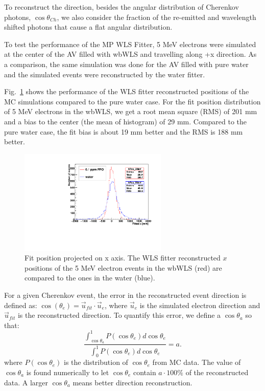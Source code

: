 To reconstruct the direction, besides the angular distribution of Cherenkov photons, $\cos\theta_{Ch}$, we also consider the fraction of the re-emitted and wavelength shifted photons that cause a flat angular distribution.

To test the performance of the MP WLS Fitter, 5 MeV electrons were simulated at the center of the AV filled with wbWLS and travelling along +x direction. As a comparison, the same simulation was done for the AV filled with pure water and the simulated events were reconstructed by the water fitter.

Fig.~\ref{WLSFitPos} shows the performance of the WLS fitter reconstructed positions of the MC simulations compared to the pure water case. For the fit position distribution of 5 MeV electrons in the wbWLS, we get a root mean square (RMS) of 201 mm and a bias to the center (the mean of histogram) of 29 mm. Compared to the pure water case, the fit bias is about 19 mm better and the RMS is 188 mm better.

\begin{figure}[htbp]	
	\centering			
	\includegraphics[height=5cm]{WLS_FittedPos.pdf}		
	\caption{\label{WLSFitPos} Fit position projected on x axis. The WLS fitter reconstructed $x$ positions of the 5 MeV electron events in the wbWLS (red) are compared to the ones in the water (blue).
	}
\end{figure}

For a given Cherenkov event, the error in the reconstructed event direction is defined as\cite{boulay2004direct}: $\cos(\theta_e)=\vec{u}_{fit}\cdot\vec{u}_e$, where $\vec{u}_e$ is the simulated electron direction and $\vec{u}_{fit}$ is the reconstructed direction. To quantify this error, we define a $\cos\theta_{a}$ so that:
\[
\frac{\int_{\cos\theta_{a}}^1 P(\cos\theta_e) d\cos\theta_e}{\int_0^1 P(\cos\theta_e) d\cos\theta_e} = a.
\] 
where $P(\cos\theta_e)$ is the distribution of $\cos\theta_e$ from MC data. The value of $\cos\theta_{a}$ is found numerically to let $\cos\theta_e$ contain $ a\cdot 100\%$ of the reconstructed data. A larger $\cos\theta_{a}$ means better direction reconstruction.

